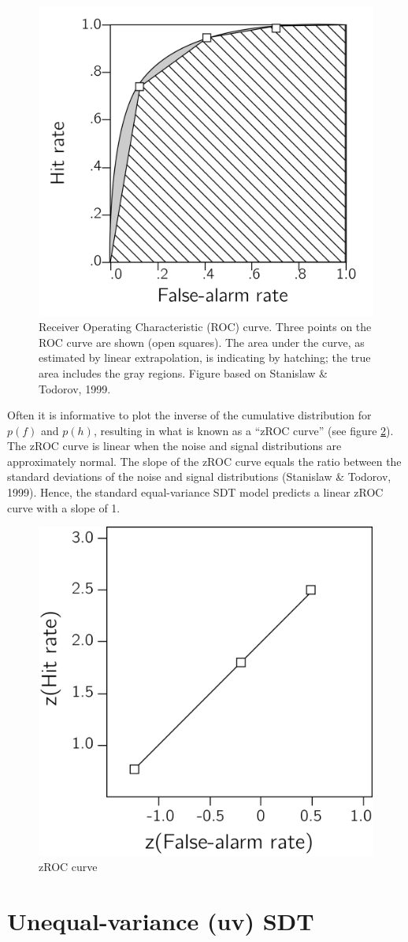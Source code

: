 \documentclass[12pt,twoside]{reedthesis}
\begin{document}
\begin{figure}
\includegraphics[width=0.6\linewidth]{figure/app-SDT/ROC_rep} \caption[Receiver Operative Characteristic (ROC) curve]{Receiver Operating Characteristic (ROC) curve. Three points on the ROC curve are shown (open squares). The area under the curve, as estimated by linear extrapolation, is indicating by hatching; the true area includes the gray regions. Figure based on Stanislaw \& Todorov, 1999.}\label{fig:app1-ROC}
\end{figure}
Often it is informative to plot the inverse of the cumulative distribution for \(p(f)\) and \(p(h)\), resulting in what is known as a ``zROC curve'' (see figure \ref{fig:app1-zROC}). The zROC curve is linear when the noise and signal distributions are approximately normal. The slope of the zROC curve equals the ratio between the standard deviations of the noise and signal distributions (Stanislaw \& Todorov, 1999). Hence, the standard equal-variance SDT model predicts a linear zROC curve with a slope of 1.
\begin{figure}
\includegraphics[width=0.6\linewidth]{figure/app-SDT/zROC_rep} \caption{zROC curve}\label{fig:app1-zROC}
\end{figure}
\hypertarget{app1:uvSDT}{%
\section{Unequal-variance (uv) SDT}\label{app1:uvSDT}}
\end{document}
